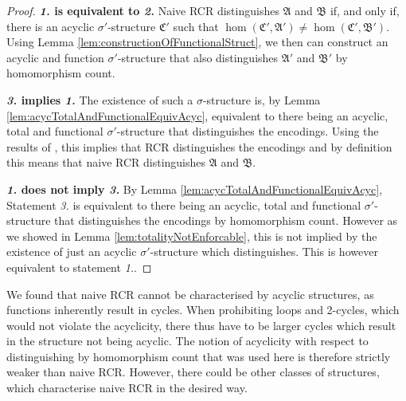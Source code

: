 \begin{proof}
	\textbf{\emph{1.} is equivalent to \emph{2.}}
	Naive RCR distinguishes $\mathfrak A$ and $\mathfrak B$ if, and only if, there is an acyclic $\sigma'$-structure $\mathfrak C'$ such that $\hom(\mathfrak C',\mathfrak A')\neq\hom(\mathfrak C',\mathfrak B')$.
	Using Lemma \ref{lem:constructionOfFunctionalStruct}, we then can construct an acyclic and function $\sigma'$-structure that also distinguishes $\mathfrak A'$ and $\mathfrak B'$ by homomorphism count.

	\textbf{\emph{3.} implies \emph{1.}}
	The existence of such a $\sigma$-structure is, by Lemma \ref{lem:acycTotalAndFunctionalEquivAcyc}, equivalent to there being an acyclic, total and functional $\sigma'$-structure that distinguishes the encodings.
	Using the results of \cite{scheidt2025ColorRefinement}, this implies that RCR distinguishes the encodings and by definition this means that naive RCR distinguishes $\mathfrak A$ and $\mathfrak B$.
	
	\textbf{\emph{1.} does not imply \emph{3.}}
	By Lemma \ref{lem:acycTotalAndFunctionalEquivAcyc}, Statement \emph{3.} is equivalent to there being an acyclic, total and functional $\sigma'$-structure that distinguishes the encodings by homomorphism count.
	However as we showed in Lemma \ref{lem:totalityNotEnforcable}, this is not implied by the existence of just an acyclic $\sigma'$-structure which distinguishes. 
	This is however equivalent to statement \emph{1.}.
\end{proof}

We found that naive RCR cannot be characterised by acyclic structures, as functions inherently result in cycles. 
When prohibiting loops and 2-cycles, which would not violate the acyclicity, there thus have to be larger cycles which result in the structure not being acyclic.
The notion of acyclicity with respect to distinguishing by homomorphism count that was used here is therefore strictly weaker than naive RCR.
However, there could be other classes of structures, which characterise naive RCR in the desired way.


